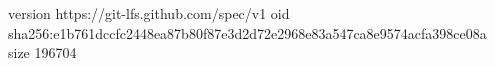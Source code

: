 version https://git-lfs.github.com/spec/v1
oid sha256:e1b761dccfc2448ea87b80f87e3d2d72e2968e83a547ca8e9574acfa398ce08a
size 196704
